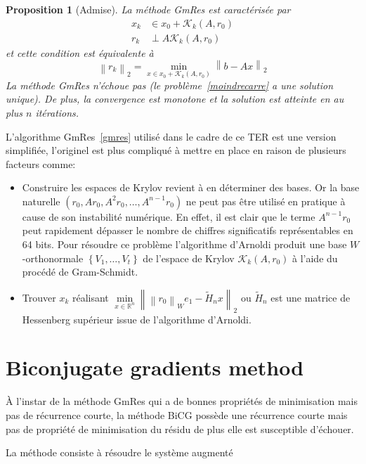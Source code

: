 \documentclass[twoside,12pt]{report}
\newtheorem{prop}{Proposition}
\theoremstyle{remark}
\begin{document}
\begin{prop}[Admise]
La méthode GmRes est caractérisée par
\begin{align*}
x_k &\in x_0 + \mathcal{K}_k(A,r_0) \\
r_k &\perp A\mathcal{K}_k(A,r_0)
\end{align*}
et cette condition est équivalente à
\begin{equation}
\left\|r_k\right\|_2 = \min_{x \in x_0 + \mathcal{K}_k(A,r_0)} \left\|b-Ax\right\|_2 \label{moindrecarre}
\end{equation}
La méthode GmRes n'échoue pas (le problème~\ref{moindrecarre} a une solution unique). De plus, la convergence est monotone et la solution est atteinte en au plus $n$ itérations.
\end{prop}

L'algorithme GmRes~\ref{gmres} utilisé dans le cadre de ce TER est une version simplifiée, l'originel est plus compliqué à mettre en place en raison de plusieurs facteurs comme:
\begin{itemize}
\item Construire les espaces de Krylov revient à en déterminer des bases. Or la base naturelle $(r_0,Ar_0,A^2r_0,\ldots,A^{n-1}r_0)$ ne peut pas être utilisé en pratique à cause de son instabilité numérique. En effet, il est clair que le terme $A^{n-1}r_0$ peut rapidement dépasser le nombre de chiffres significatifs représentables en 64 bits. Pour résoudre ce problème l'algorithme d'Arnoldi produit une base $W$-orthonormale $\left\{V_1,\ldots,V_t\right\}$ de l'espace de Krylov $\mathcal{K}_k(A,r_0)$ à l'aide du procédé de Gram-Schmidt.
\item Trouver $x_k$ réalisant $\min\limits_{x \in \mathbb{R}^n} \left\|\left\|r_0\right\|_We_1-\tilde{H}_nx\right\|_2$ ou $\tilde{H}_n$ est une matrice de Hessenberg supérieur issue de l'algorithme d'Arnoldi.
\end{itemize}

\section{Biconjugate gradients method}

À l'instar de la méthode GmRes qui a de bonnes propriétés de minimisation mais pas de récurrence courte, la méthode BiCG possède une récurrence courte mais pas de propriété de minimisation du résidu de plus elle est susceptible d'échouer.

La méthode consiste à résoudre le système augmenté
\end{document}
